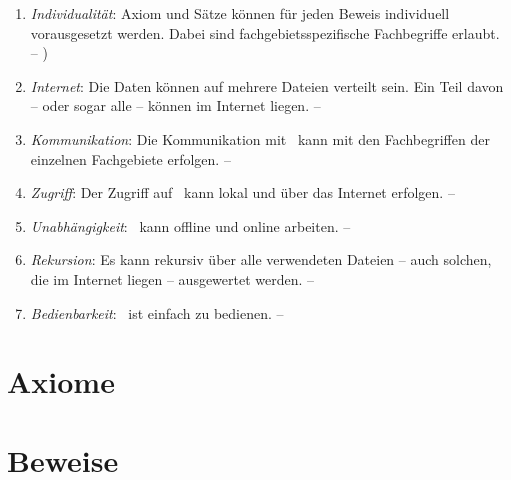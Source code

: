 \begin{enumerate}
	\item \label{Anforderung:Individualität} \emph{Individualität}:
	Axiom und Sätze können für jeden Beweis individuell vorausgesetzt werden.
	Dabei sind fachgebietsspezifische Fachbegriffe erlaubt.
	-- )

	\item \label{Anforderung:Internet} \emph{Internet}:
	Die Daten können auf mehrere Dateien verteilt sein.
	Ein Teil davon -- oder sogar alle -- können im Internet liegen.
	-- 

	\item \label{Anforderung:Kommunikation} \emph{Kommunikation}:
	Die Kommunikation mit \ASBA\ kann mit den Fachbegriffen der einzelnen Fachgebiete erfolgen.
	-- 

	\item \label{Anforderung:Zugriff} \emph{Zugriff}:
	Der Zugriff auf \ASBA\ kann lokal und über das Internet erfolgen.
	-- 

	\item \label{Anforderung:Unabhängigkeit} \emph{Unabhängigkeit}:
	\ASBA\ kann offline und online arbeiten.
	-- 

	\item \label{Anforderung:Rekursion} \emph{Rekursion}:
	Es kann rekursiv über alle verwendeten Dateien -- auch solchen, die im Internet liegen -- ausgewertet werden.
	-- 

	\item \label{Anforderung:Bedienbarkeit} \emph{Bedienbarkeit}:
	\ASBA\ ist einfach zu bedienen.
	-- 

\end{enumerate}

\section{Axiome}%
\label{sec:Axiome}

\section{Beweise}%
\label{sec:Beweise}

